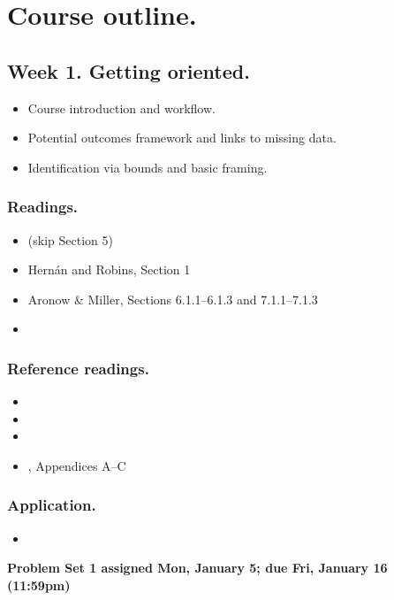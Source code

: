 \documentclass[letterpaper, 12pt, parskip=full,DIV=10]{scrartcl}
\begin{document}
\section*{Course outline.}

\subsection*{Week 1. Getting oriented.}
\begin{itemize}
\item Course introduction and workflow.
\item Potential outcomes framework and links to missing data.
\item Identification via bounds and basic framing.
\end{itemize}

\subsubsection*{Readings.}
\begin{itemize}
\item {} (skip Section 5)
\item Hernán and Robins, Section 1
\item Aronow \& Miller, Sections 6.1.1--6.1.3 and 7.1.1--7.1.3
\item {}
\end{itemize}

\subsubsection*{Reference readings.}
\begin{itemize}
\item {} 
\item {}
\item {}
\item {}, Appendices A--C
\end{itemize}

\subsubsection*{Application.}
\begin{itemize}
\item {}
\end{itemize}

\textbf{Problem Set 1 assigned Mon, January 5; due Fri, January 16 (11:59pm)}
\end{document}
